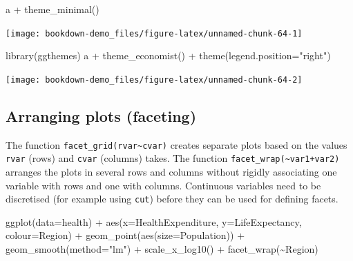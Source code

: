 \documentclass[
]{book}
\newenvironment{Shaded}{\begin{snugshade}}{\end{snugshade}}
\newcommand{\AttributeTok}[1]{\textcolor[rgb]{0.77,0.63,0.00}{#1}}
\newcommand{\FunctionTok}[1]{\textcolor[rgb]{0.00,0.00,0.00}{#1}}
\newcommand{\NormalTok}[1]{#1}
\newcommand{\SpecialCharTok}[1]{\textcolor[rgb]{0.00,0.00,0.00}{#1}}
\newcommand{\StringTok}[1]{\textcolor[rgb]{0.31,0.60,0.02}{#1}}
\begin{document}
\begin{Shaded}
\begin{Highlighting}[]
\NormalTok{a }\SpecialCharTok{+} \FunctionTok{theme\_minimal}\NormalTok{()}
\end{Highlighting}
\end{Shaded}

\texttt{[image: bookdown-demo\_files/figure-latex/unnamed-chunk-64-1]}

\begin{Shaded}
\begin{Highlighting}[]
\FunctionTok{library}\NormalTok{(ggthemes)}
\NormalTok{a }\SpecialCharTok{+} \FunctionTok{theme\_economist}\NormalTok{() }\SpecialCharTok{+} \FunctionTok{theme}\NormalTok{(}\AttributeTok{legend.position=}\StringTok{"right"}\NormalTok{)}
\end{Highlighting}
\end{Shaded}

\texttt{[image: bookdown-demo\_files/figure-latex/unnamed-chunk-64-2]}

\hypertarget{arranging-plots-faceting}{%
\subsection{Arranging plots (faceting)}\label{arranging-plots-faceting}}

The function \texttt{facet\_grid(rvar\textasciitilde{}cvar)} creates separate plots based on the values \texttt{rvar} (rows) and \texttt{cvar} (columns) takes. The function \texttt{facet\_wrap(\textasciitilde{}var1+var2)} arranges the plots in several rows and columns without rigidly associating one variable with rows and one with columns. Continuous variables need to be discretised (for example using \texttt{cut}) before they can be used for defining facets.

\begin{Shaded}
\begin{Highlighting}[]
\FunctionTok{ggplot}\NormalTok{(}\AttributeTok{data=}\NormalTok{health) }\SpecialCharTok{+} 
    \FunctionTok{aes}\NormalTok{(}\AttributeTok{x=}\NormalTok{HealthExpenditure,  }\AttributeTok{y=}\NormalTok{LifeExpectancy, }\AttributeTok{colour=}\NormalTok{Region) }\SpecialCharTok{+}
    \FunctionTok{geom\_point}\NormalTok{(}\FunctionTok{aes}\NormalTok{(}\AttributeTok{size=}\NormalTok{Population)) }\SpecialCharTok{+}
    \FunctionTok{geom\_smooth}\NormalTok{(}\AttributeTok{method=}\StringTok{"lm"}\NormalTok{)  }\SpecialCharTok{+}
    \FunctionTok{scale\_x\_log10}\NormalTok{() }\SpecialCharTok{+}
    \FunctionTok{facet\_wrap}\NormalTok{(}\SpecialCharTok{\textasciitilde{}}\NormalTok{Region)}
\end{Highlighting}
\end{Shaded}
\end{document}

